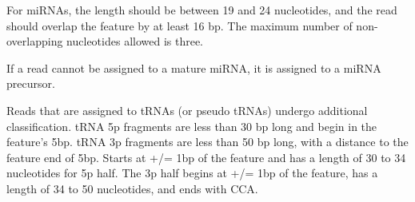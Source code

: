 \documentclass[12pt,twoside]{reedthesis}
\newenvironment{Shaded}{\begin{snugshade}}{\end{snugshade}}
\newcommand{\AttributeTok}[1]{\textcolor[rgb]{0.77,0.63,0.00}{#1}}
\newcommand{\ControlFlowTok}[1]{\textcolor[rgb]{0.13,0.29,0.53}{\textbf{#1}}}
\newcommand{\DecValTok}[1]{\textcolor[rgb]{0.00,0.00,0.81}{#1}}
\newcommand{\NormalTok}[1]{#1}
\newcommand{\SpecialCharTok}[1]{\textcolor[rgb]{0.00,0.00,0.00}{#1}}
\newcommand{\StringTok}[1]{\textcolor[rgb]{0.31,0.60,0.02}{#1}}
\begin{document}
For miRNAs, the length should be between 19 and 24 nucleotides, and the
read should overlap the feature by at least 16 bp. The maximum number of
non-overlapping nucleotides allowed is three.
\begin{Shaded}
\end{Shaded}
If a read cannot be assigned to a mature miRNA, it is assigned to a
miRNA precursor.
\begin{Shaded}
\end{Shaded}
Reads that are assigned to tRNAs (or pseudo tRNAs) undergo additional
classification. tRNA 5p fragments are less than 30 bp long and begin in
the feature's 5bp. tRNA 3p fragments are less than 50 bp long, with a
distance to the feature end of 5bp. Starts at +/= 1bp of the feature and
has a length of 30 to 34 nucleotides for 5p half. The 3p half begins at
+/= 1bp of the feature, has a length of 34 to 50 nucleotides, and ends
with CCA.
\end{document}
